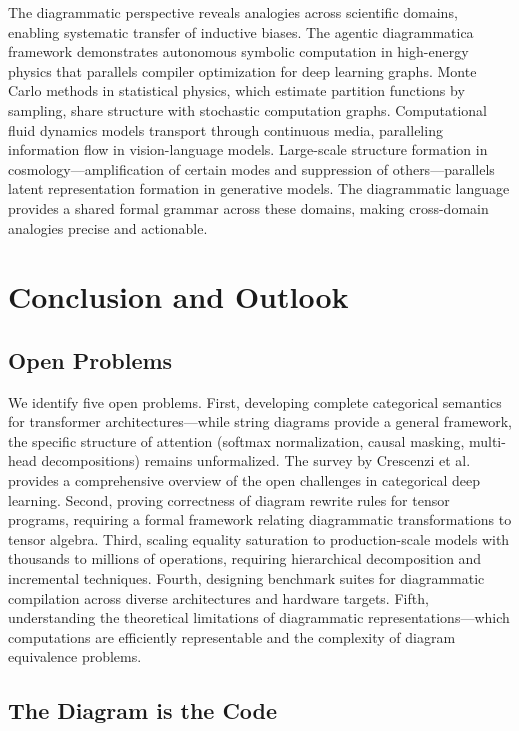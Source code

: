 \documentclass[12pt,a4paper]{article}
\begin{document}
The diagrammatic perspective reveals analogies across scientific domains, enabling systematic transfer of inductive biases. The agentic diagrammatica framework \cite{agentic2026agentic} demonstrates autonomous symbolic computation in high-energy physics that parallels compiler optimization for deep learning graphs. Monte Carlo methods in statistical physics, which estimate partition functions by sampling, share structure with stochastic computation graphs. Computational fluid dynamics models transport through continuous media, paralleling information flow in vision-language models. Large-scale structure formation in cosmology---amplification of certain modes and suppression of others---parallels latent representation formation in generative models. The diagrammatic language provides a shared formal grammar across these domains, making cross-domain analogies precise and actionable.

\section{Conclusion and Outlook}
\subsection{Open Problems}

We identify five open problems. First, developing complete categorical semantics for transformer architectures---while string diagrams provide a general framework, the specific structure of attention (softmax normalization, causal masking, multi-head decompositions) remains unformalized. The survey by Crescenzi et al.~\cite{crescenzi2024towards} provides a comprehensive overview of the open challenges in categorical deep learning. Second, proving correctness of diagram rewrite rules for tensor programs, requiring a formal framework relating diagrammatic transformations to tensor algebra. Third, scaling equality saturation \cite{tate2011equality} to production-scale models with thousands to millions of operations, requiring hierarchical decomposition and incremental techniques. Fourth, designing benchmark suites for diagrammatic compilation across diverse architectures and hardware targets. Fifth, understanding the theoretical limitations of diagrammatic representations---which computations are efficiently representable and the complexity of diagram equivalence problems.

\subsection{The Diagram is the Code}
\end{document}
